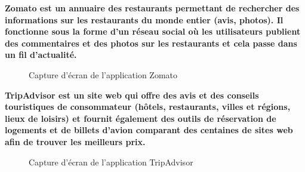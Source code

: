 \bf{Zomato} est un annuaire des restaurants permettant de rechercher des informations sur les restaurants du monde entier (avis, photos). Il fonctionne sous la forme d'un réseau social où les utilisateurs publient des commentaires et des photos sur les restaurants et cela passe dans un fil d'actualité.

\begin{figure}[H]
    \label{fig-zomato}
    \noindent{}
    \caption{Capture d'écran de l'application Zomato}
\end{figure}

\bf{TripAdvisor} est un site web qui offre des avis et des conseils touristiques de consommateur (hôtels, restaurants, villes et régions, lieux de loisirs) et fournit également des outils de réservation de logements et de billets d'avion comparant des centaines de sites web afin de trouver les meilleurs prix.

\begin{figure}[H]
    \label{fig-trip-advisor}
    \noindent{}
    \caption{Capture d'écran de l'application TripAdvisor}
\end{figure}

